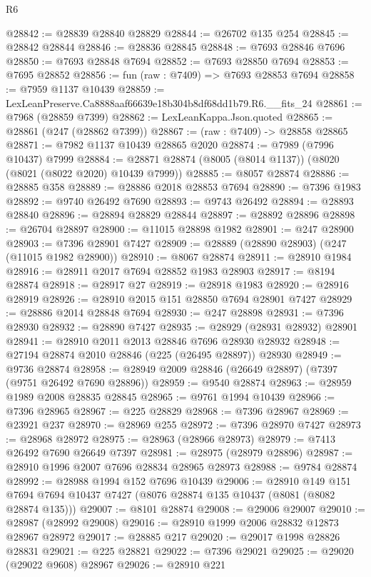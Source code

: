\begin{lexlean}{R6}
\begin{coremodule}
@28842 := @28839 @28840 @28829
@28844 := @26702 @135 @254
@28845 := @28842 @28844
@28846 := @28836 @28845
@28848 := @7693 @28846 @7696
@28850 := @7693 @28848 @7694
@28852 := @7693 @28850 @7694
@28853 := @7695 @28852
@28856 := fun (raw : @7409) => @7693 @28853 @7694
@28858 := @7959 @1137 @10439
@28859 := LexLeanPreserve.Ca8888aaf66639e18b304b8df68dd1b79.R6.__fits_24
@28861 := @7968 (@28859 @7399)
@28862 := LexLeanKappa.Json.quoted
@28865 := @28861 (@247 (@28862 @7399))
@28867 := (raw : @7409) -> @28858 @28865
@28871 := @7982 @1137 @10439 @28865 @2020
@28874 := @7989 (@7996 @10437) @7999
@28884 := @28871 @28874 (@8005 (@8014 @1137)) (@8020 (@8021 (@8022 @2020) @10439 @7999))
@28885 := @8057 @28874
@28886 := @28885 @358
@28889 := @28886 @2018 @28853 @7694
@28890 := @7396 @1983
@28892 := @9740 @26492 @7690
@28893 := @9743 @26492
@28894 := @28893 @28840
@28896 := @28894 @28829 @28844
@28897 := @28892 @28896
@28898 := @26704 @28897
@28900 := @11015 @28898 @1982
@28901 := @247 @28900
@28903 := @7396 @28901 @7427
@28909 := @28889 (@28890 @28903) (@247 (@11015 @1982 @28900))
@28910 := @8067 @28874
@28911 := @28910 @1984
@28916 := @28911 @2017 @7694 @28852 @1983 @28903
@28917 := @8194 @28874
@28918 := @28917 @27
@28919 := @28918 @1983
@28920 := @28916 @28919
@28926 := @28910 @2015 @151 @28850 @7694 @28901 @7427
@28929 := @28886 @2014 @28848 @7694
@28930 := @247 @28898
@28931 := @7396 @28930
@28932 := @28890 @7427
@28935 := @28929 (@28931 @28932) @28901
@28941 := @28910 @2011 @2013 @28846 @7696 @28930 @28932
@28948 := @27194 @28874 @2010 @28846 (@225 (@26495 @28897)) @28930
@28949 := @9736 @28874
@28958 := @28949 @2009 @28846 (@26649 @28897) (@7397 (@9751 @26492 @7690 @28896))
@28959 := @9540 @28874
@28963 := @28959 @1989 @2008 @28835 @28845
@28965 := @9761 @1994 @10439
@28966 := @7396 @28965
@28967 := @225 @28829
@28968 := @7396 @28967
@28969 := @23921 @237
@28970 := @28969 @255
@28972 := @7396 @28970 @7427
@28973 := @28968 @28972
@28975 := @28963 (@28966 @28973)
@28979 := @7413 @26492 @7690 @26649 @7397
@28981 := @28975 (@28979 @28896)
@28987 := @28910 @1996 @2007 @7696 @28834 @28965 @28973
@28988 := @9784 @28874
@28992 := @28988 @1994 @152 @7696 @10439
@29006 := @28910
    @149
    @151
    @7694
    @7694
    @10437
    @7427
    (@8076 @28874 @135 @10437 (@8081 (@8082 @28874 @135)))
@29007 := @8101 @28874
@29008 := @29006 @29007
@29010 := @28987 (@28992 @29008)
@29016 := @28910 @1999 @2006 @28832 @12873 @28967 @28972
@29017 := @28885 @217
@29020 := @29017 @1998 @28826 @28831
@29021 := @225 @28821
@29022 := @7396 @29021
@29025 := @29020 (@29022 @9608) @28967
@29026 := @28910 @221

\end{coremodule}
\end{lexlean}
